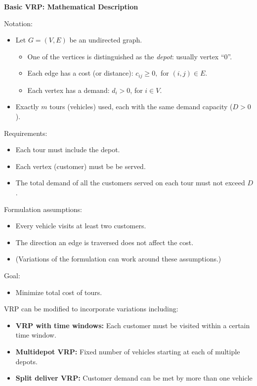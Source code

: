 \documentclass[11pt]{article}
\theoremstyle{definition}
\begin{document}
\begin{tcolorbox}
\textbf{Basic VRP:  Mathematical Description}

Notation: 
\begin{itemize}
	\item Let $G = (V,E)$ be an undirected graph.  
		\begin{itemize}
			\item One of the vertices is distinguished as the \emph{depot}: usually vertex ``$0$''.
			\item Each edge has a cost (or distance): $c_{ij} \ge 0,$ for $(i,j) \in E$.
			\item Each vertex has a demand: $d_i >0$, for $i \in V$.
		\end{itemize}
	\item  Exactly $m$ tours (vehicles) used, each with the same demand capacity ($D >0$).
\end{itemize}

Requirements:
\begin{itemize}
	\item Each tour must include the depot.
	\item Each vertex (customer) must be be served.
	\item The total demand of all the customers served on each tour must not exceed $D$.
\end{itemize}

Formulation assumptions:
\begin{itemize}
	\item Every vehicle visits at least two customers.
	\item The direction an edge is traversed does not affect the cost.
	\item (Variations of the formulation can work around these assumptions.)
\end{itemize}
Goal:
\begin{itemize}
	\item  Minimize total cost of tours.
\end{itemize}
\end{tcolorbox}


VRP can be modified to incorporate variations including:
\begin{itemize}
\item \textbf{VRP with time windows:}  Each customer must be visited within a certain time window.
\item \textbf{Multidepot VRP:}  Fixed number of vehicles starting at each of multiple depots. 
\item \textbf{Split deliver VRP: } Customer demand can be met by more than one vehicle
\end{itemize}
\end{document}

